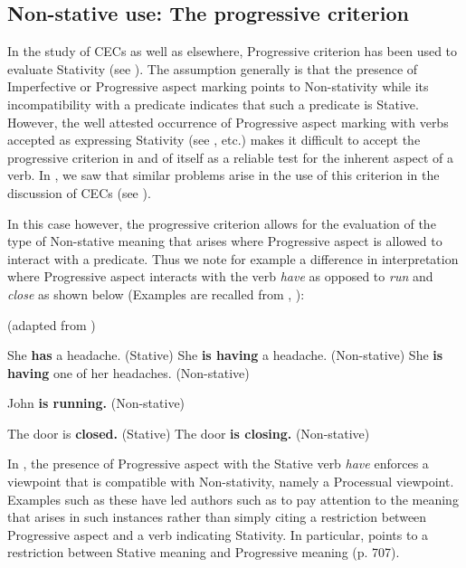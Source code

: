\subsection{Non-stative use: The progressive criterion}\label{sec:5.1.1}

In the study of CECs as well as elsewhere,  Progressive criterion has been used to evaluate Stativity (see \citealt{Jaganauth1987,Bickerton1975,Gooden2008}). The assumption generally is that the presence of Imperfective or Progressive aspect marking points to Non-stativity while its incompatibility with a predicate indicates that such a predicate is Stative. However, the well attested occurrence of Progressive aspect marking with verbs accepted as expressing Stativity (see \citealt{Verkuyl1993, Lyons1977,Smith1983,Smith1991}, etc.) makes it difficult to accept the progressive criterion in and of itself as a reliable test for the inherent aspect of a verb. In , we saw that similar problems arise in the use of this criterion in the discussion of CECs (see ). 

In this case however, the progressive criterion allows for the evaluation of the type of Non-stative meaning that arises where Progressive aspect is allowed to interact with a predicate. Thus we note for example a difference in interpretation where Progressive aspect interacts with the verb \textit{have} as opposed to \textit{run} and \textit{close} as shown below (Examples are recalled from , ):


\ea%
 \label{ex:5:1} 
 (adapted from \citealt[707]{Lyons1977})

\ea She \textbf{has} a headache. (Stative)
\ex She \textbf{is having} a headache. (Non-stative)
\ex She \textbf{is having} one of her headaches. (Non-stative)
\z
 \z

\ea%
 \label{ex:5:2}
 John \textbf{is running.} (Non-stative)
 \z

\ea%
 \label{ex:5:3}
\ea The door is \textbf{closed.} (Stative)
\ex The door \textbf{is closing.} (Non-stative)
\z
 \z

In , the presence of Progressive aspect with the Stative verb \textit{have} enforces a viewpoint that is compatible with Non-stativity, namely a Processual viewpoint. Examples such as these have led authors such as \citet{Lyons1977,Smith1983} to pay attention to the meaning that arises in such instances rather than simply citing a restriction between Progressive aspect and a verb indicating Stativity. In particular, \citet{Lyons1977} points to a restriction between Stative meaning and Progressive meaning (p. 707). 

